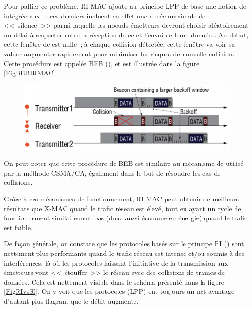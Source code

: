 Pour pallier ce problème, RI-MAC ajoute au principe LPP de base
une notion de  intégrée aux ~:
ces derniers incluent en effet une durée maximale de <<~silence~>>
parmi laquelle les noeuds émetteurs devront choisir aléatoirement
un délai à respecter entre la réception de ce  et
l'envoi de leurs données. Au début, cette fenêtre de 
est nulle~; à chaque collision détectée, cette fenêtre va voir
sa valeur augmenter rapidement pour minimiser les risques de nouvelle
collision. Cette procédure est appelée BEB (), et est illustrée dans la figure \vref{FigBEBRIMAC}.

\begin{figure}[!hbt]
\centering
\includegraphics[width=12.5cm]{images/ch3-ri-mac-backoff.png}
\label{FigBEBRIMAC}
\end{figure}

On peut noter que cette procédure de BEB est similaire au mécanisme de
 utilisé par la méthode CSMA/CA, également dans le but
de résoudre les cas de collisions.

\medskip

Grâce à ces mécanismes de fonctionnement, RI-MAC peut obtenir de meilleurs
résultats que X-MAC quand le trafic réseau est élevé, tout en ayant
un cycle de fonctionnement similairement bas (donc aussi économe en
énergie) quand le trafic est faible.

De façon générale, on constate que les protocoles basés sur le principe
RI () sont nettement plus performants quand le
trafic réseau est intense et/ou soumis à des interférences, là où les
protocoles laissant l'initiative de la transmission aux émetteurs vont
<<~étouffer~>> le réseau avec des collisions de trames de données.
Cela est nettement visible dans le schéma présenté dans la figure
\vref{FigRIvsSI}. On y voit que les protocoles
 (LPP) ont toujours un net avantage,
d'autant plus flagrant que le débit augmente.


